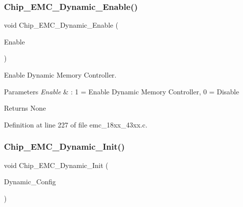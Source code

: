 \subsubsection{\texorpdfstring{Chip\+\_\+\+E\+M\+C\+\_\+\+Dynamic\+\_\+\+Enable()}{Chip\_EMC\_Dynamic\_Enable()}}
{\footnotesize\ttfamily void Chip\+\_\+\+E\+M\+C\+\_\+\+Dynamic\+\_\+\+Enable (\begin{DoxyParamCaption}\item[{uint8\+\_\+t}]{Enable }\end{DoxyParamCaption})}



Enable Dynamic Memory Controller. 


\begin{DoxyParams}{Parameters}
{\em Enable} & \+: 1 = Enable Dynamic Memory Controller, 0 = Disable \\
\hline
\end{DoxyParams}
\begin{DoxyReturn}{Returns}
None 
\end{DoxyReturn}


Definition at line 227 of file emc\+\_\+18xx\+\_\+43xx.\+c.

\mbox{\label{group___e_m_c__18_x_x__43_x_x_ga8d91e59911be4b9c0f9de5ea24ac54bb}} 
\subsubsection{\texorpdfstring{Chip\+\_\+\+E\+M\+C\+\_\+\+Dynamic\+\_\+\+Init()}{Chip\_EMC\_Dynamic\_Init()}}
{\footnotesize\ttfamily void Chip\+\_\+\+E\+M\+C\+\_\+\+Dynamic\+\_\+\+Init (\begin{DoxyParamCaption}\item[{\hyperlink{struct_i_p___e_m_c___d_y_n___c_o_n_f_i_g___t}{I\+P\+\_\+\+E\+M\+C\+\_\+\+D\+Y\+N\+\_\+\+C\+O\+N\+F\+I\+G\+\_\+T} $\ast$}]{Dynamic\+\_\+\+Config }\end{DoxyParamCaption})}




